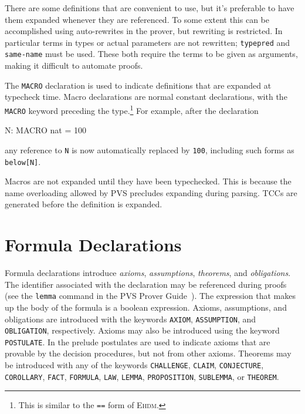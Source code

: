 There are some definitions that are convenient to use, but it's preferable
to have them expanded whenever they are referenced.  To some extent this
can be accomplished using auto-rewrites in the prover, but rewriting is
restricted.  In particular terms in types or actual parameters are not
rewritten; \texttt{typepred} and \texttt{same-name} must be used.  These
both require the terms to be given as arguments, making it difficult to
automate proofs.

The \texttt{MACRO} declaration is used to indicate definitions that are
expanded at typecheck time.  Macro declarations are normal constant
declarations, with the \texttt{MACRO} keyword preceding the
type.\footnote{This is similar to the \texttt{==} form of E\textsc{hdm}.}
For example, after the declaration
\begin{pvsex}
  N: MACRO nat = 100
\end{pvsex}
any reference to \texttt{N} is now automatically replaced by \texttt{100},
including such forms as \texttt{below[N]}.

Macros are not expanded until they have been typechecked.  This is because
the name overloading allowed by PVS precludes expanding during parsing.
TCCs are generated before the definition is expanded.



\section{Formula Declarations}\label{formula-declarations}

Formula declarations introduce \emph{axioms},
\emph{assumptions}, \emph{theorems},
and \emph{obligations}.  The identifier associated with
the declaration may be referenced during proofs (see the \texttt{lemma}
command in the PVS Prover Guide~\cite{PVS:prover}).  The expression
that makes up the body of the formula is a boolean expression.  Axioms,
assumptions, and obligations are introduced with the keywords
\texttt{AXIOM}, \texttt{ASSUMPTION}, and \texttt{OBLIGATION},
respectively.  Axioms may also be introduced using the keyword
\texttt{POSTULATE}.  In the prelude postulates are used
to indicate axioms that are provable by the decision procedures, but not
from other axioms.  Theorems may be introduced with any of the keywords
\texttt{CHALLENGE},
\texttt{CLAIM},
\texttt{CONJECTURE},
\texttt{COROLLARY},
\texttt{FACT},
\texttt{FORMULA},
\texttt{LAW},
\texttt{LEMMA},
\texttt{PROPOSITION},
\texttt{SUBLEMMA}, or
\texttt{THEOREM}.

